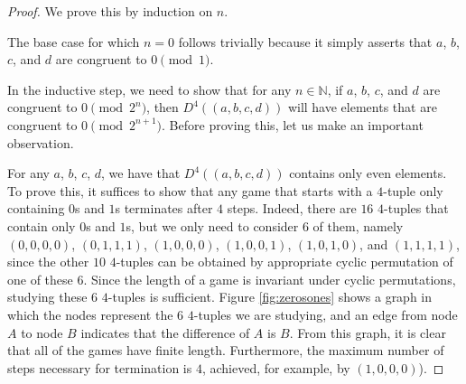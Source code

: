 \documentclass[12pt]{amsart}
\newcommand{\diff}{D}
\newcommand{\znn}{\mathbb{N}}
\begin{document}
\begin{proof}
We prove this by induction on $n$.

The base case for which $n=0$ follows trivially because it simply asserts that $a$, $b$, $c$, and $d$ are congruent to $0\pmod{1}$.

In the inductive step, we need to show that for any $n \in \znn$, if $a$, $b$, $c$, and $d$ are congruent to $0\pmod{2^n}$, then $\diff^4((a, b, c, d))$ will have elements that are congruent to $0\pmod{2^{n+1}}$. Before proving this, let us make an important observation.

For any $a$, $b$, $c$, $d$, we have that $\diff^4((a,b,c,d))$ contains only even elements. To prove this, it suffices to show that any game that starts with a $4$-tuple only containing $0$s and $1$s terminates after $4$ steps. Indeed, there are $16$ $4$-tuples that contain only $0$s and $1$s, but we only need to consider $6$ of them, namely $(0,0,0,0)$, $(0,1,1,1)$, $(1,0,0,0)$, $(1,0,0,1)$, $(1,0,1,0)$, and $(1,1,1,1)$, since the other $10$ $4$-tuples can be obtained by appropriate cyclic permutation of one of these $6$. Since the length of a game is invariant under cyclic permutations, studying these $6$ $4$-tuples is sufficient. Figure \ref{fig:zerosones} shows a graph in which the nodes represent the $6$ $4$-tuples we are studying, and an edge from node $A$ to node $B$ indicates that the difference of $A$ is $B$. From this graph, it is clear that all of the games have finite length. Furthermore, the maximum number of steps necessary for termination is $4$, achieved, for example, by $(1,0,0,0)$).


\end{proof}
\end{document}
